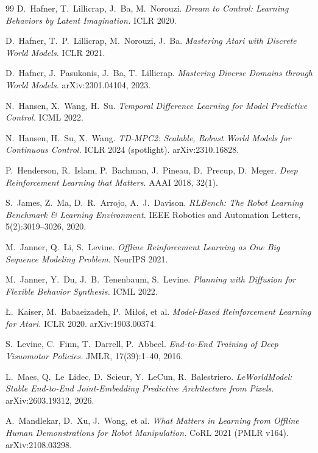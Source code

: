 \documentclass{article}
\begin{document}
\begin{thebibliography}{99}
D.~Hafner, T.~Lillicrap, J.~Ba, M.~Norouzi.
\emph{Dream to Control: Learning Behaviors by Latent Imagination.}
ICLR 2020.

D.~Hafner, T.~P.~Lillicrap, M.~Norouzi, J.~Ba.
\emph{Mastering Atari with Discrete World Models.}
ICLR 2021.

D.~Hafner, J.~Pasukonis, J.~Ba, T.~Lillicrap.
\emph{Mastering Diverse Domains through World Models.}
arXiv:2301.04104, 2023.

N.~Hansen, X.~Wang, H.~Su.
\emph{Temporal Difference Learning for Model Predictive Control.}
ICML 2022.

N.~Hansen, H.~Su, X.~Wang.
\emph{TD-MPC2: Scalable, Robust World Models for Continuous Control.}
ICLR 2024 (spotlight). arXiv:2310.16828.

P.~Henderson, R.~Islam, P.~Bachman, J.~Pineau, D.~Precup, D.~Meger.
\emph{Deep Reinforcement Learning that Matters.}
AAAI 2018, 32(1).

S.~James, Z.~Ma, D.~R.~Arrojo, A.~J.~Davison.
\emph{RLBench: The Robot Learning Benchmark \& Learning Environment.}
IEEE Robotics and Automation Letters, 5(2):3019--3026, 2020.

M.~Janner, Q.~Li, S.~Levine.
\emph{Offline Reinforcement Learning as One Big Sequence Modeling Problem.}
NeurIPS 2021.

M.~Janner, Y.~Du, J.~B.~Tenenbaum, S.~Levine.
\emph{Planning with Diffusion for Flexible Behavior Synthesis.}
ICML 2022.

{\L}.~Kaiser, M.~Babaeizadeh, P.~Mi{\l}o{\'s}, et al.
\emph{Model-Based Reinforcement Learning for Atari.}
ICLR 2020. arXiv:1903.00374.

S.~Levine, C.~Finn, T.~Darrell, P.~Abbeel.
\emph{End-to-End Training of Deep Visuomotor Policies.}
JMLR, 17(39):1--40, 2016.

L.~Maes, Q.~Le~Lidec, D.~Scieur, Y.~LeCun, R.~Balestriero.
\emph{LeWorldModel: Stable End-to-End Joint-Embedding Predictive Architecture from Pixels.}
arXiv:2603.19312, 2026.

A.~Mandlekar, D.~Xu, J.~Wong, et al.
\emph{What Matters in Learning from Offline Human Demonstrations for Robot Manipulation.}
CoRL 2021 (PMLR v164). arXiv:2108.03298.


\end{thebibliography}
\end{document}
